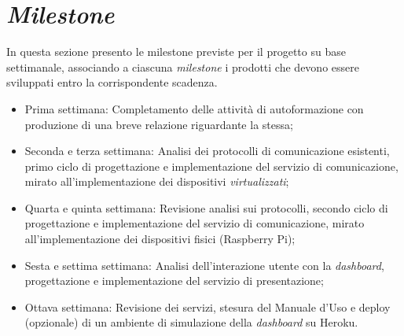 \section{\emph{Milestone}}
In questa sezione presento le \gls{milestone} previste per il progetto su base settimanale, associando a ciascuna \emph{milestone} i prodotti che devono essere sviluppati entro la corrispondente scadenza.
\begin{itemize}
	\item Prima settimana: Completamento delle attività di autoformazione con produzione di una breve relazione riguardante la stessa;
	\item Seconda e terza settimana: Analisi dei protocolli di comunicazione esistenti, primo ciclo di progettazione e implementazione del servizio di comunicazione, mirato all'implementazione dei dispositivi \textit{virtualizzati};
	\item Quarta e quinta settimana: Revisione analisi sui protocolli, secondo ciclo di progettazione e implementazione del servizio di comunicazione, mirato all'implementazione dei dispositivi fisici (Raspberry Pi);
	\item Sesta e settima settimana: Analisi dell'interazione utente con la \emph{dashboard}, progettazione e implementazione del servizio di presentazione;
	\item Ottava settimana: Revisione dei servizi, stesura del Manuale d'Uso e deploy (opzionale) di un ambiente di simulazione della \emph{dashboard} su Heroku.
\end{itemize}
